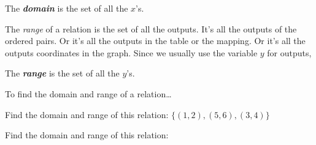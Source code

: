 \begin{center}
\begin{tcolorbox}[width=3in]
    The {\bfseries\itshape domain} is the set of all the $x$'s.
\end{tcolorbox}
\end{center}

The \emph{range} of a relation is the set of all the outputs.
It's all the outputs of the ordered pairs.
Or it's all the outputs in the table or the mapping.
Or it's all the outputs coordinates in the graph.
Since we usually use the variable $y$ for outputs,

\begin{center}
\begin{tcolorbox}[width=3in]
    The {\bfseries\itshape range} is the set of all the $y$'s.
\end{tcolorbox}
\end{center}


\begin{myConceptSteps}{To find the domain and range of a relation\dots}
\end{myConceptSteps}

\begin{myExample}{
    Find the domain and range of this relation:
    \(
        \{ (1,2), (5,6), (3,4) \}
    \)
}
    \vspace{1in}
\end{myExample}

\begin{myExample}{
    Find the domain and range of this relation:
    \begin{center}
    \end{center}
}
    \vspace{1in}
\end{myExample}


